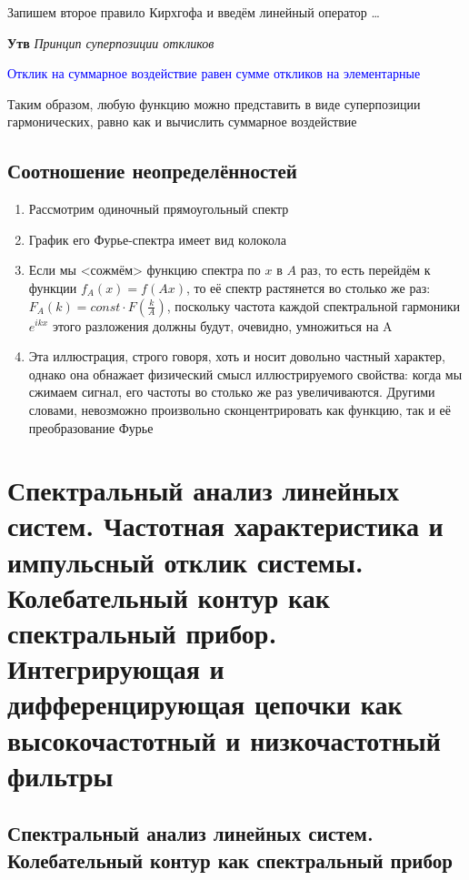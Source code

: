 \documentclass[a4paper, 14pt]{article}
\begin{document}
    Запишем второе правило Кирхгофа и введём линейный оператор \ldots
    
    \textbf{Утв} \textit{Принцип суперпозиции откликов}
    
    \textcolor{blue}{Отклик на суммарное воздействие равен сумме откликов на элементарные}
    
    Таким образом, любую функцию можно представить в виде суперпозиции гармонических, равно как и вычислить суммарное
    воздействие
    
    \subsection{Соотношение неопределённостей}
    
    \begin{enumerate}
        \item Рассмотрим одиночный прямоугольный спектр
        \item График его Фурье-спектра имеет вид колокола
        \item Если мы <сожмём> функцию спектра по $x$ в $A$ раз, то есть перейдём к функции $f_A(x) = f(Ax)$, то её
        спектр растянется во столько же раз: $F_A(k) = const \cdot F\left(\frac{k}{A}\right)$, поскольку частота каждой
        спектральной
        гармоники $e^{ikx}$ этого разложения должны будут, очевидно, умножиться на A
        \item Эта иллюстрация, строго говоря, хоть и носит довольно частный характер, однако она обнажает
        физический смысл иллюстрируемого свойства: когда мы сжимаем сигнал, его частоты во столько же раз увеличиваются.
        Другими словами, невозможно произвольно сконцентрировать как функцию, так и её преобразование Фурье
    \end{enumerate}
    
    \section{Спектральный анализ линейных систем.
    Частотная характеристика и импульсный отклик системы.
    Колебательный контур как спектральный прибор.
    Интегрирующая и дифференцирующая цепочки как высокочастотный и низкочастотный фильтры}
    
    \subsection{Спектральный анализ линейных систем. Колебательный контур как спектральный прибор}
    
\end{document}
